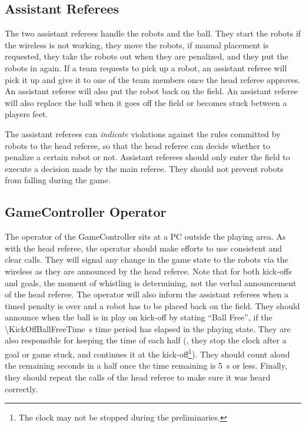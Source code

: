 \subsection{Assistant Referees}
\label{sec:assist_referee}
The two assistant referees handle the robots and the ball. They start the robots if the wireless is not working, they move the robots, if manual placement is requested, they take the robots out when they are penalized, and they put the robots in again. If a team requests to pick up a robot, an assistant referee will pick it up and give it to one of the team members once the head referee approves. An assistant referee will also put the robot back on the field. An assistant referee will also replace the ball when it goes off the field or becomes stuck between a players feet.

The assistant referees can \textit{indicate} violations against the rules committed by robots to the head referee, so that the head referee can decide whether to penalize a certain robot or not. Assistant referees should only enter the field to execute a decision made by the main referee. They should not prevent robots from falling during the game.

\subsection{GameController Operator}
\label{sec:gameControllerOp}
The operator of the GameController sits at a PC outside the playing area.
As with the head referee, the operator should make efforts to use consistent and clear calls.
They will signal any change in the game state to the robots via the wireless as they are announced by the head referee.
Note that for both kick-offs and goals, the moment of whistling is determining, not the verbal announcement of the head referee.
The operator will also inform the assistant referees when a timed penalty is over and a robot has to be placed back on the field.
They should announce when the ball is in play on kick-off by stating ``Ball Free'', if the \qty{\KickOffBallFreeTime}{\second} time period has elapsed in the playing state.
They are also responsible for keeping the time of each half (\ie, they stop the clock after a goal or game stuck, and continues it at the kick-off\footnote{The clock may not be stopped during the preliminaries.}).
They should count aloud the remaining seconds in a half once the time remaining is \qty{5}{\second} or less.
Finally, they should repeat the calls of the head referee to make sure it was heard correctly.

